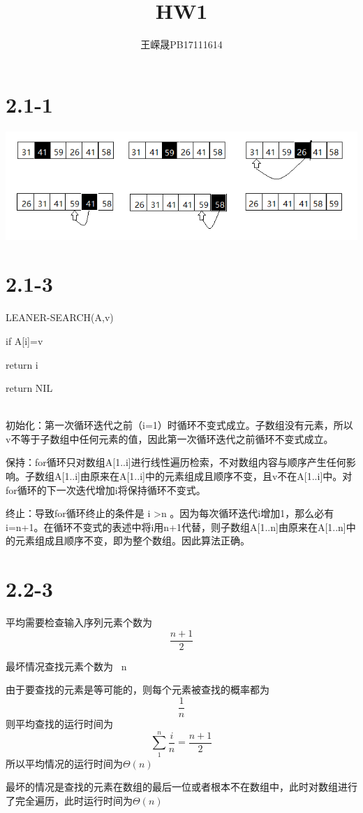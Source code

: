 \documentclass[UTF8]{ctexart}
\title{HW1}
\author{王嵘晟PB17111614}
\date{}
\begin{document}
\maketitle
\section*{2.1-1}
\includegraphics[scale=0.5]{HW1.png}
\section*{2.1-3}
    \noindent LEANER-SEARCH(A,v)
	\par{}     
	\par{if A[i]=v}
	\par{return i}
	
	\noindent return NIL
	\\
	\\
    \par{初始化：第一次循环迭代之前（i=1）时循环不变式成立。子数组没有元素，所以v不等于子数组中任何元素的值，因此第一次循环迭代之前循环不变式成立。}
    \par 保持：for循环只对数组A[1..i]进行线性遍历检索，不对数组内容与顺序产生任何影响。子数组A[1..i]由原来在A[1..i]中的元素组成且顺序不变，且v不在A[1..i]中。对for循环的下一次迭代增加i将保持循环不变式。
    \par {终止：导致for循环终止的条件是}
    i \textgreater n
    。因为每次循环迭代i增加1，那么必有i=n+1。在循环不变式的表述中将i用n+1代替，则子数组A[1..n]由原来在A[1..n]中的元素组成且顺序不变，即为整个数组。因此算法正确。
\section*{2.2-3}
    \par {平均需要检查输入序列元素个数为}
    $$\frac{n+1}{2}$$
    \par 最坏情况查找元素个数为 \ n
    \\
    \par{由于要查找的元素是等可能的，则每个元素被查找的概率都为  $$ \frac{1}{n} $$ 则平均查找的运行时间为 $$ \sum_{1}^{n}\frac{i}{n}=\frac{n+1}{2}$$所以平均情况的运行时间为$\Theta(n)$}
    \par{最坏的情况是查找的元素在数组的最后一位或者根本不在数组中，此时对数组进行了完全遍历，此时运行时间为$\Theta(n)$}
\end{document}
